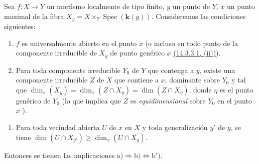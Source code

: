 \begin{proposition}[14.3.13]
\label{IV.14.3.13}
Sea $f:X\to Y$ un morfismo localmente de tipo finito, $y$ un punto de $Y$, $x$ un punto maximal de la fibra $X_y=X\times_Y\operatorname{Spec}(\boldsymbol{k}(y))$.
Consideremos las condiciones siguientes:
\begin{enumerate}[label=\emph{\alph*)}]
  \item $f$ es universalmente abierto en el punto $x$ \textup{(o incluso en todo punto de la componente irreducible de $X_y$ de punto genérico $x$ {\hyperlink{ega4.c04.subsec.14-3-3-1}{(14.3.3.1, (ii))}})}.
  \item Para toda componente irreducible $Y_0$ de $Y$ que contenga a $y$, existe una componente irreducible $Z$ de $X$ que contiene a $x$, dominante sobre $Y_0$ y tal que $\dim_x(X_y)=\dim_x(Z\cap X_y)=\dim(Z\cap X_\eta)$, donde $\eta$ es el punto genérico de $Y_0$ \textup{(lo que implica que $Z$ es \emph{equidimensional} sobre $Y_0$ en el punto $x$ )}.
\end{enumerate}


\begin{enumerate}[label=\emph{\alph*$'$)}]
  \item[\textup{b$'$)}] Para toda vecindad abierta $U$ de $x$ en $X$ y toda generalización $y'$ de $y$, se tiene $\dim(U\cap X_{y'})\geq\dim_x(U\cap X_y)$.
\end{enumerate}

Entonces se tienen las implicaciones $\mathrm{a})\Rightarrow\mathrm{b})\Leftrightarrow\mathrm{b}')$.
\end{proposition}

